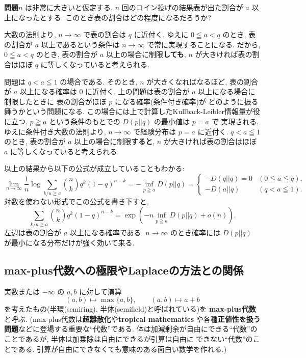 \documentclass[12pt,twoside]{jarticle}
\theoremstyle{jplain}
\theoremstyle{jplain}
\theoremstyle{jplain}
\numberwithin{theorem}{section}
\numberwithin{equation}{section}
\numberwithin{figure}{section}
\numberwithin{table}{section}
\begin{document}
\medskip

{\bfseries 問題}\enspace $n$ は非常に大きいと仮定する.
$n$ 回のコイン投げの結果表が出た割合が $a$ 以上になったとする.
このとき表の割合はどの程度になるだろうか?

\medskip

大数の法則より, $n\to\infty$ で表の割合は $q$ に近付く.
ゆえに $0\leqq a<q$ のとき, 表の割合が $a$ 以上であるという条件は
$n\to\infty$ で常に実現することになる.
だから, $0\leqq a<q$ のとき, 表の割合が $a$ 以上の場合に制限{\bfseries しても},
$n$ が大きければ表の割合はほぼ $q$ に等しくなっていると考えられる.

問題は $q<a\leqq 1$ の場合である.
そのとき, $n$ が大きくなればなるほど,
表の割合が $a$ 以上になる確率は $0$ に近付く.
上の問題は表の割合が $a$ 以上になる場合に制限したときに
表の割合がほぼ $p$ になる確率(条件付き確率)が
どのように振る舞うかという問題になる.
この場合には上で計算したKullback-Leibler情報量が役に立つ.
$p\geqq a$ という条件のもとでの $D(p||q)$ の最小値は $p=a$ で
実現される. ゆえに条件付き大数の法則より,
$n\to\infty$ で経験分布は $p=a$ に近付く.
$q<a\leqq 1$ のとき, 表の割合が $a$ 以上の場合に制限{\bfseries すると},
$n$ が大きければ表の割合はほぼ $a$ に等しくなっていると考えられる.

以上の結果から以下の公式が成立していることもわかる:
\[
\lim_{n\to\infty}
\frac{1}{n}\log\sum_{k/n\geqq a} \binom{n}{k}q^k(1-q)^{n-k}
=-\inf_{p\geqq a} D(p||q)
=
\begin{cases}
-D(q||q)=0 & (0\leqq a\leqq q), \\
-D(a||q)   & (q<a\leqq 1).
\end{cases}
\]
対数を使わない形式でこの公式を書き下すと,
\[
\sum_{k/n\geqq a} \binom{n}{k}q^k(1-q)^{n-k}
=
\exp\left(-n\inf_{p\geqq a}D(p||q) + o(n)\right).
\]
左辺は表の割合が $a$ 以上になる確率である.
$n\to\infty$ のとき確率には $D(p||q)$ が最小になる分布だけが強く効いて来る.



\subsection{max-plus代数への極限やLaplaceの方法との関係}

実数または $-\infty$ の $a,b$ に対して演算
\[
(a,b)\mapsto\max\{a,b\}, \qquad
(a,b)\mapsto a+b
\]
を考えたもの(半環(semiring), 半体(semifield)と呼ばれている)を
{\bfseries max-plus代数}と呼ぶ.
(max-plus代数は{\bfseries 超離散化}や{\bfseries tropical mathematics}
や各種{\bfseries 正値性を扱う問題}などに登場する重要な``代数''である.
体は加減剰余が自由にできる``代数''のことであるが,
半体は加乗除は自由にできるが引算は自由に
できない``代数''のことである.
引算が自由にできなくても意味のある面白い数学を作れる.)
\end{document}
